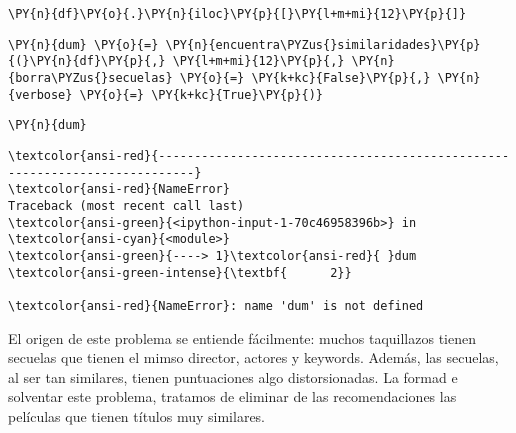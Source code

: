     \begin{tcolorbox}[breakable, size=fbox, boxrule=1pt, pad at break*=1mm,colback=cellbackground, colframe=cellborder]
\begin{Verbatim}[commandchars=\\\{\}]
\PY{n}{df}\PY{o}{.}\PY{n}{iloc}\PY{p}{[}\PY{l+m+mi}{12}\PY{p}{]}
\end{Verbatim}
\end{tcolorbox}

    \begin{tcolorbox}[breakable, size=fbox, boxrule=1pt, pad at break*=1mm,colback=cellbackground, colframe=cellborder]
\begin{Verbatim}[commandchars=\\\{\}]
\PY{n}{dum} \PY{o}{=} \PY{n}{encuentra\PYZus{}similaridades}\PY{p}{(}\PY{n}{df}\PY{p}{,} \PY{l+m+mi}{12}\PY{p}{,} \PY{n}{borra\PYZus{}secuelas} \PY{o}{=} \PY{k+kc}{False}\PY{p}{,} \PY{n}{verbose} \PY{o}{=} \PY{k+kc}{True}\PY{p}{)}
\end{Verbatim}
\end{tcolorbox}

    \begin{tcolorbox}[breakable, size=fbox, boxrule=1pt, pad at break*=1mm,colback=cellbackground, colframe=cellborder]
\begin{Verbatim}[commandchars=\\\{\}]
\PY{n}{dum}
\end{Verbatim}
\end{tcolorbox}

    \begin{Verbatim}[commandchars=\\\{\}, frame=single, framerule=2mm, rulecolor=\color{outerrorbackground}]
\textcolor{ansi-red}{---------------------------------------------------------------------------}
\textcolor{ansi-red}{NameError}                                 Traceback (most recent call last)
\textcolor{ansi-green}{<ipython-input-1-70c46958396b>} in \textcolor{ansi-cyan}{<module>}
\textcolor{ansi-green}{----> 1}\textcolor{ansi-red}{ }dum
\textcolor{ansi-green-intense}{\textbf{      2}} 

\textcolor{ansi-red}{NameError}: name 'dum' is not defined
    \end{Verbatim}

    El origen de este problema se entiende fácilmente: muchos taquillazos
tienen secuelas que tienen el mimso director, actores y keywords.
Además, las secuelas, al ser tan similares, tienen puntuaciones algo
distorsionadas. La formad e solventar este problema, tratamos de
eliminar de las recomendaciones las películas que tienen títulos muy
similares.

